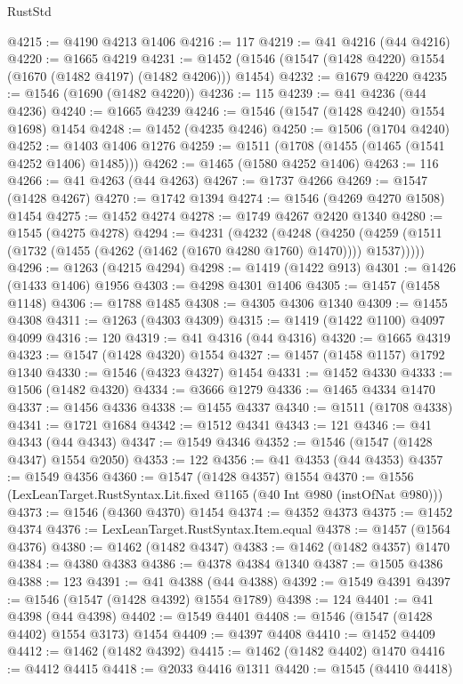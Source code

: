 \begin{lexlean}{RustStd}
\begin{coremodule}
@4215 := @4190 @4213 @1406
@4216 := 117
@4219 := @41 @4216 (@44 @4216)
@4220 := @1665 @4219
@4231 := @1452 (@1546 (@1547 (@1428 @4220) @1554 (@1670 (@1482 @4197) (@1482 @4206))) @1454)
@4232 := @1679 @4220
@4235 := @1546 (@1690 (@1482 @4220))
@4236 := 115
@4239 := @41 @4236 (@44 @4236)
@4240 := @1665 @4239
@4246 := @1546 (@1547 (@1428 @4240) @1554 @1698) @1454
@4248 := @1452 (@4235 @4246)
@4250 := @1506 (@1704 @4240)
@4252 := @1403 @1406 @1276
@4259 := @1511 (@1708 (@1455 (@1465 (@1541 @4252 @1406) @1485)))
@4262 := @1465 (@1580 @4252 @1406)
@4263 := 116
@4266 := @41 @4263 (@44 @4263)
@4267 := @1737 @4266
@4269 := @1547 (@1428 @4267)
@4270 := @1742 @1394
@4274 := @1546 (@4269 @4270 @1508) @1454
@4275 := @1452 @4274
@4278 := @1749 @4267 @2420 @1340
@4280 := @1545 (@4275 @4278)
@4294 := @4231
    (@4232
      (@4248
        (@4250 (@4259 (@1511 (@1732 (@1455 (@4262 (@1462 (@1670 @4280 @1760) @1470)))) @1537)))))
@4296 := @1263 (@4215 @4294)
@4298 := @1419 (@1422 @913)
@4301 := @1426 (@1433 @1406) @1956
@4303 := @4298 @4301 @1406
@4305 := @1457 (@1458 @1148)
@4306 := @1788 @1485
@4308 := @4305 @4306 @1340
@4309 := @1455 @4308
@4311 := @1263 (@4303 @4309)
@4315 := @1419 (@1422 @1100) @4097 @4099
@4316 := 120
@4319 := @41 @4316 (@44 @4316)
@4320 := @1665 @4319
@4323 := @1547 (@1428 @4320) @1554
@4327 := @1457 (@1458 @1157) @1792 @1340
@4330 := @1546 (@4323 @4327) @1454
@4331 := @1452 @4330
@4333 := @1506 (@1482 @4320)
@4334 := @3666 @1279
@4336 := @1465 @4334 @1470
@4337 := @1456 @4336
@4338 := @1455 @4337
@4340 := @1511 (@1708 @4338)
@4341 := @1721 @1684
@4342 := @1512 @4341
@4343 := 121
@4346 := @41 @4343 (@44 @4343)
@4347 := @1549 @4346
@4352 := @1546 (@1547 (@1428 @4347) @1554 @2050)
@4353 := 122
@4356 := @41 @4353 (@44 @4353)
@4357 := @1549 @4356
@4360 := @1547 (@1428 @4357) @1554
@4370 := @1556 (LexLeanTarget.RustSyntax.Lit.fixed @1165 (@40 Int @980 (instOfNat @980)))
@4373 := @1546 (@4360 @4370) @1454
@4374 := @4352 @4373
@4375 := @1452 @4374
@4376 := LexLeanTarget.RustSyntax.Item.equal
@4378 := @1457 (@1564 @4376)
@4380 := @1462 (@1482 @4347)
@4383 := @1462 (@1482 @4357) @1470
@4384 := @4380 @4383
@4386 := @4378 @4384 @1340
@4387 := @1505 @4386
@4388 := 123
@4391 := @41 @4388 (@44 @4388)
@4392 := @1549 @4391
@4397 := @1546 (@1547 (@1428 @4392) @1554 @1789)
@4398 := 124
@4401 := @41 @4398 (@44 @4398)
@4402 := @1549 @4401
@4408 := @1546 (@1547 (@1428 @4402) @1554 @3173) @1454
@4409 := @4397 @4408
@4410 := @1452 @4409
@4412 := @1462 (@1482 @4392)
@4415 := @1462 (@1482 @4402) @1470
@4416 := @4412 @4415
@4418 := @2033 @4416 @1311
@4420 := @1545 (@4410 @4418)

\end{coremodule}
\end{lexlean}
